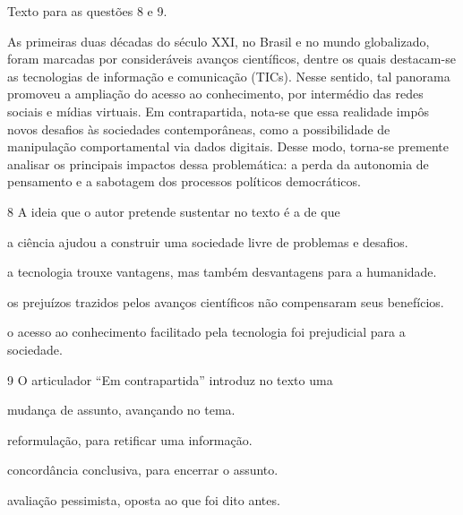 Texto para as questões 8 e 9.

\begin{myquote}
As primeiras duas décadas do século XXI, no Brasil e no mundo
globalizado, foram marcadas por consideráveis avanços científicos,
dentre os quais destacam-se as tecnologias de informação e comunicação
(TICs). Nesse sentido, tal panorama promoveu a ampliação do acesso ao
conhecimento, por intermédio das redes sociais e mídias virtuais. Em
contrapartida, nota-se que essa realidade impôs novos desafios às
sociedades contemporâneas, como a possibilidade de manipulação
comportamental via dados digitais. Desse modo, torna-se premente
analisar os principais impactos dessa problemática: a perda da autonomia
de pensamento e a sabotagem dos processos políticos democráticos.

\end{myquote}

\num{8} A ideia que o autor pretende sustentar no texto é a de que

\begin{escolha}
\item a ciência ajudou a construir uma sociedade livre de problemas e desafios.

\item a tecnologia trouxe vantagens, mas também desvantagens para a humanidade.

\item os prejuízos trazidos pelos avanços científicos não compensaram seus benefícios.

\item o acesso ao conhecimento facilitado pela tecnologia foi prejudicial para a sociedade.
\end{escolha}

\pagebreak
\num{9} 
O articulador ``Em contrapartida'' introduz no texto uma

\begin{escolha}
\item mudança de assunto, avançando no tema.

\item reformulação, para retificar uma informação.

\item concordância conclusiva, para encerrar o assunto.

\item avaliação pessimista, oposta ao que foi dito antes.
\end{escolha}

